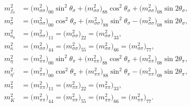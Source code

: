 \begin{subequations}
\begin{align}
	m^2_{f_0}  &= \big(m^2_{\sigma\sigma}\big)_{00} \sin^2 \theta_\sigma + \big(m^2_{\sigma\sigma}\big)_{88} \cos^2 \theta_\sigma + \big(m^2_{\sigma\sigma}\big)_{08} \sin 2 \theta_\sigma, \\ %
	m^2_\sigma &= \big(m^2_{\sigma\sigma}\big)_{00} \cos^2 \theta_\sigma + \big(m^2_{\sigma\sigma}\big)_{88} \sin^2 \theta_\sigma - \big(m^2_{\sigma\sigma}\big)_{08} \sin 2 \theta_\sigma, \\ %
	m^2_{a_0}  &= \big(m^2_{\sigma\sigma}\big)_{11} = \big(m^2_{\sigma\sigma}\big)_{22} = \big(m^2_{\sigma\sigma}\big)_{33}, \\
	m^2_\kappa &= \big(m^2_{\sigma\sigma}\big)_{44} = \big(m^2_{\sigma\sigma}\big)_{55} = \big(m^2_{\sigma\sigma}\big)_{66} = \big(m^2_{\sigma\sigma}\big)_{77}, \\
	m^2_{\eta} &= \big(m^2_{\pi\pi}\big)_{00} \sin^2 \theta_\pi + \big(m^2_{\pi\pi}\big)_{88} \cos^2 \theta_\pi + \big(m^2_{\pi\pi}\big)_{08} \sin 2 \theta_\pi, \\ %
	m^2_{\eta'}&= \big(m^2_{\pi\pi}\big)_{00} \cos^2 \theta_\pi + \big(m^2_{\pi\pi}\big)_{88} \sin^2 \theta_\pi - \big(m^2_{\pi\pi}\big)_{08} \sin 2 \theta_\pi, \\ %
	m^2_\pi    &= \big(m^2_{\pi\pi}\big)_{11} = \big(m^2_{\pi\pi}\big)_{22} = \big(m^2_{\pi\pi}\big)_{33}, \\
	m^2_K      &= \big(m^2_{\pi\pi}\big)_{44} = \big(m^2_{\pi\pi}\big)_{55} = \big(m^2_{\pi\pi}\big)_{66} = \big(m^2_{\pi\pi}\big)_{77}.
\end{align}%
\label{eq:lsm:mass_system_3f}%
\end{subequations}%

